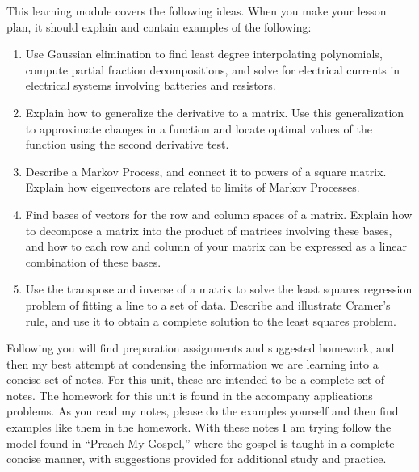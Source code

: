 \documentclass[10pt]{article}
\newcommand{\mytitle}{Applications}
\begin{document}
\noindent{\huge{\bf \mytitle}}

\noindent
This learning module covers the following ideas.  When you make your lesson plan, it should explain and contain examples of the following:
\begin{enumerate}

\item Use Gaussian elimination to find least degree interpolating polynomials, compute partial fraction decompositions, and solve for electrical currents in electrical systems involving batteries and resistors.
\item Explain how to generalize the derivative to a matrix. Use this generalization to approximate changes in a function and locate optimal values of the function using the second derivative test.
\item Describe a Markov Process, and connect it to powers of a square matrix. Explain how eigenvectors are related to limits of Markov Processes.
\item Find bases of vectors for the row and column spaces of a matrix. Explain how to decompose a matrix into the product of matrices involving these bases, and how to each row and column of your matrix can be expressed as a linear combination of these bases.
\item Use the transpose and inverse of a matrix to solve the least squares regression problem of fitting a line to a set of data. Describe and illustrate Cramer's rule, and use it to obtain a complete solution to the least squares problem.
\end{enumerate}


Following you will find preparation assignments and suggested homework, and then my best attempt at condensing the information we are learning into a concise set of notes.  For this unit, these are intended to be a complete set of notes.  The homework for this unit is found in the accompany applications problems. As you read my notes, please do the examples yourself and then find examples like them in the homework. With these notes I am trying follow the model found in ``Preach My Gospel,'' where the gospel is taught in a complete concise manner, with suggestions provided for additional study and practice.
\end{document}

